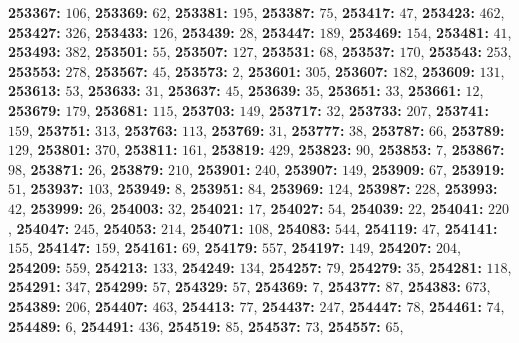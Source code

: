 \textsf{\bfseries 253367:} $106$, \textsf{\bfseries 253369:} $62$, \textsf{\bfseries 253381:} $195$, \textsf{\bfseries 253387:} $75$, \textsf{\bfseries 253417:} $47$, \textsf{\bfseries 253423:} $462$, \textsf{\bfseries 253427:} $326$, \textsf{\bfseries 253433:} $126$, \textsf{\bfseries 253439:} $28$, \textsf{\bfseries 253447:} $189$, \textsf{\bfseries 253469:} $154$, \textsf{\bfseries 253481:} $41$, \textsf{\bfseries 253493:} $382$, \textsf{\bfseries 253501:} $55$, \textsf{\bfseries 253507:} $127$, \textsf{\bfseries 253531:} $68$, \textsf{\bfseries 253537:} $170$, \textsf{\bfseries 253543:} $253$, \textsf{\bfseries 253553:} $278$, \textsf{\bfseries 253567:} $45$, \textsf{\bfseries 253573:} $2$, \textsf{\bfseries 253601:} $305$, \textsf{\bfseries 253607:} $182$, \textsf{\bfseries 253609:} $131$, \textsf{\bfseries 253613:} $53$, \textsf{\bfseries 253633:} $31$, \textsf{\bfseries 253637:} $45$, \textsf{\bfseries 253639:} $35$, \textsf{\bfseries 253651:} $33$, \textsf{\bfseries 253661:} $12$, \textsf{\bfseries 253679:} $179$, \textsf{\bfseries 253681:} $115$, \textsf{\bfseries 253703:} $149$, \textsf{\bfseries 253717:} $32$, \textsf{\bfseries 253733:} $207$, \textsf{\bfseries 253741:} $159$, \textsf{\bfseries 253751:} $313$, \textsf{\bfseries 253763:} $113$, \textsf{\bfseries 253769:} $31$, \textsf{\bfseries 253777:} $38$, \textsf{\bfseries 253787:} $66$, \textsf{\bfseries 253789:} $129$, \textsf{\bfseries 253801:} $370$, \textsf{\bfseries 253811:} $161$, \textsf{\bfseries 253819:} $429$, \textsf{\bfseries 253823:} $90$, \textsf{\bfseries 253853:} $7$, \textsf{\bfseries 253867:} $98$, \textsf{\bfseries 253871:} $26$, \textsf{\bfseries 253879:} $210$, \textsf{\bfseries 253901:} $240$, \textsf{\bfseries 253907:} $149$, \textsf{\bfseries 253909:} $67$, \textsf{\bfseries 253919:} $51$, \textsf{\bfseries 253937:} $103$, \textsf{\bfseries 253949:} $8$, \textsf{\bfseries 253951:} $84$, \textsf{\bfseries 253969:} $124$, \textsf{\bfseries 253987:} $228$, \textsf{\bfseries 253993:} $42$, \textsf{\bfseries 253999:} $26$, \textsf{\bfseries 254003:} $32$, \textsf{\bfseries 254021:} $17$, \textsf{\bfseries 254027:} $54$, \textsf{\bfseries 254039:} $22$, \textsf{\bfseries 254041:} $220$, \textsf{\bfseries 254047:} $245$, \textsf{\bfseries 254053:} $214$, \textsf{\bfseries 254071:} $108$, \textsf{\bfseries 254083:} $544$, \textsf{\bfseries 254119:} $47$, \textsf{\bfseries 254141:} $155$, \textsf{\bfseries 254147:} $159$, \textsf{\bfseries 254161:} $69$, \textsf{\bfseries 254179:} $557$, \textsf{\bfseries 254197:} $149$, \textsf{\bfseries 254207:} $204$, \textsf{\bfseries 254209:} $559$, \textsf{\bfseries 254213:} $133$, \textsf{\bfseries 254249:} $134$, \textsf{\bfseries 254257:} $79$, \textsf{\bfseries 254279:} $35$, \textsf{\bfseries 254281:} $118$, \textsf{\bfseries 254291:} $347$, \textsf{\bfseries 254299:} $57$, \textsf{\bfseries 254329:} $57$, \textsf{\bfseries 254369:} $7$, \textsf{\bfseries 254377:} $87$, \textsf{\bfseries 254383:} $673$, \textsf{\bfseries 254389:} $206$, \textsf{\bfseries 254407:} $463$, \textsf{\bfseries 254413:} $77$, \textsf{\bfseries 254437:} $247$, \textsf{\bfseries 254447:} $78$, \textsf{\bfseries 254461:} $74$, \textsf{\bfseries 254489:} $6$, \textsf{\bfseries 254491:} $436$, \textsf{\bfseries 254519:} $85$, \textsf{\bfseries 254537:} $73$, \textsf{\bfseries 254557:} $65$, 
